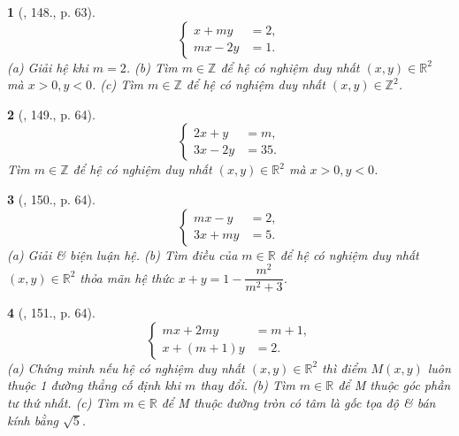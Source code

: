\documentclass{article}
\newtheorem{baitoan}{}
\begin{document}
\begin{baitoan}[\cite{Dong_23_1001_toan_I}, 148., p. 63]
	\begin{equation*}
		\left\{\begin{split}
			x + my &= 2,\\
			mx - 2y &= 1.
		\end{split}\right.
	\end{equation*}
	(a) Giải hệ khi $m = 2$. (b) Tìm $m\in\mathbb{Z}$ để hệ có nghiệm duy nhất $(x,y)\in\mathbb{R}^2$ mà $x > 0,y < 0$. (c) Tìm $m\in\mathbb{Z}$ để hệ có nghiệm duy nhất $(x,y)\in\mathbb{Z}^2$.
\end{baitoan}

\begin{baitoan}[\cite{Dong_23_1001_toan_I}, 149., p. 64]
	\begin{equation*}
		\left\{\begin{split}
			2x + y &= m,\\
			3x - 2y &= 35.
		\end{split}\right.
	\end{equation*}
	Tìm $m\in\mathbb{Z}$ để hệ có nghiệm duy nhất $(x,y)\in\mathbb{R}^2$ mà $x > 0,y < 0$.
\end{baitoan}

\begin{baitoan}[\cite{Dong_23_1001_toan_I}, 150., p. 64]
	\begin{equation*}
		\left\{\begin{split}
			mx - y &= 2,\\
			3x + my &= 5.
		\end{split}\right.
	\end{equation*}
	(a) Giải \& biện luận hệ. (b) Tìm điều của $m\in\mathbb{R}$ để hệ có nghiệm duy nhất $(x,y)\in\mathbb{R}^2$ thỏa mãn hệ thức $x + y = 1 - \dfrac{m^2}{m^2 + 3}$.
\end{baitoan}

\begin{baitoan}[\cite{Dong_23_1001_toan_I}, 151., p. 64]
	\begin{equation*}
		\left\{\begin{split}
			mx + 2my &= m + 1,\\
			x + (m + 1)y &= 2.
		\end{split}\right.
	\end{equation*}
	(a) Chứng minh nếu hệ có nghiệm duy nhất $(x,y)\in\mathbb{R}^2$ thì điểm $M(x,y)$ luôn thuộc 1 đường thẳng cố định khi $m$ thay đổi. (b) Tìm $m\in\mathbb{R}$ để M thuộc góc phần tư thứ nhất. (c) Tìm $m\in\mathbb{R}$ để M thuộc đường tròn có tâm là gốc tọa độ \& bán kính bằng $\sqrt{5}$.
\end{baitoan}
\end{document}
